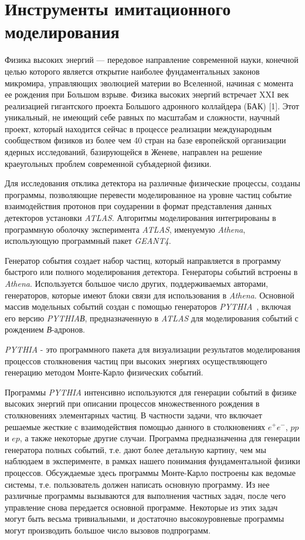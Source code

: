 \section{Инструменты имитационного моделирования}

Физика высоких энергий — передовое направление современной науки, конечной целью которого является открытие наиболее фундаментальных законов микромира, управляющих эволюцией материи во Вселенной, начиная с момента ее рождения при Большом взрыве. Физика высоких энергий встречает XXI век реализацией гигантского проекта Большого адронного коллайдера (БАК) [1]. Этот уникальный, не имеющий себе равных по масштабам и сложности, научный проект, который находится сейчас в процессе реализации международным сообществом физиков из более чем 40 стран на базе европейской организации ядерных исследований, базирующейся в Женеве, направлен на решение краеугольных проблем современной субъядерной физики.

Для исследования отклика детектора на различные физические процессы, созданы программы, позволяющие перевести моделированное на уровне частиц событие  взаимодействия протонов при соударении в формат представления данных детекторов установки \textit{ATLAS}. Алгоритмы моделирования интегрированы в программную оболочку эксперимента  \textit{ATLAS}, именуемую \textit{Athena}, использующую программный пакет \textit{GEANT4}.

Генератор события создает набор частиц, который направляется в программу быстрого или полного моделирования детектора. Генераторы событий встроены в \textit{Athena}. Используется большое число других, поддерживаемых авторами, генераторов, которые имеют блоки связи для использования в \textit{Athena}. Основной массив модельных событий создан с помощью генераторов \textit{PYTHIA}~\cite{2part-pythia-all}, включая его версию \textit{PYTHIAВ},  предназначенную в  \textit{ATLAS} для моделирования событий с рождением \textit{В}-адронов.

\textit{PYTHIA} - это программного пакета для визуализации результатов моделирования процессов столкновения частиц при высоких энергиях осуществляющего генерацию методом Монте-Карло физических событий.

Программы \textit{PYTHIA} интенсивно используются для генерации событий в физике высоких энергий при описании процессов множественного рождения в столкновениях элементарных частиц. В частности задачи, что включает решаемые жесткие с взаимодействия помощью данного в столкновениях $e^+e^-$, $pp$ и $ep$, а также некоторые другие случаи. Программа предназначенна для генерации генератора полных событий, т.е. дают более детальную картину, чем мы наблюдаем в эксперименте, в рамках нашего понимания фундаментальной физики процессов. Обсуждаемые здесь программы Монте-Карло построены как ведомые системы, т.е. пользователь должен написать основную программу. Из нее различные программы вызываются для выполнения частных задач, после чего управление снова передается основной программе. Некоторые из этих задач могут быть весьма тривиальными, и достаточно высокоуровневые программы могут производить большое число вызовов подпрограмм.

